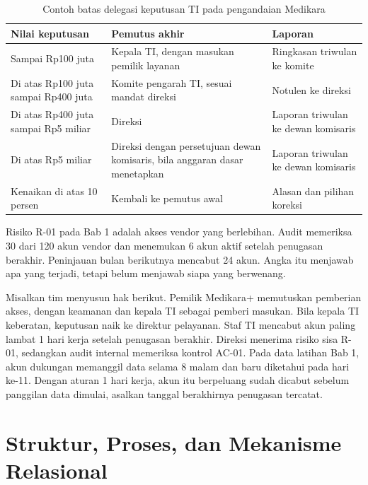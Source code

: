 \begin{table}[!htb]
  \centering\small
  \caption{Contoh batas delegasi keputusan TI pada pengandaian Medikara}
  \label{tab:ch02-delegasi}
  \begin{tabularx}{\textwidth}{|>{\raggedright\arraybackslash}p{}|>{\raggedright\arraybackslash}X|>{\raggedright\arraybackslash}p{}|}
    \hline
    \textbf{Nilai keputusan} & \textbf{Pemutus akhir} & \textbf{Laporan} \\ \hline
    Sampai Rp100 juta & Kepala TI, dengan masukan pemilik layanan & Ringkasan triwulan ke komite \\
    \hline
    Di atas Rp100 juta sampai Rp400 juta & Komite pengarah TI, sesuai mandat direksi &
    Notulen ke direksi \\ \hline
    Di atas Rp400 juta sampai Rp5 miliar & Direksi & Laporan triwulan ke dewan komisaris \\
    \hline
    Di atas Rp5 miliar & Direksi dengan persetujuan dewan komisaris, bila anggaran dasar
    menetapkan & Laporan triwulan ke dewan komisaris \\ \hline
    Kenaikan di atas 10 persen & Kembali ke pemutus awal & Alasan dan pilihan koreksi \\
    \hline
  \end{tabularx}
\end{table}

\begin{kasus}[title={Kasus Medikara Health: Siapa Mencabut Akun Vendor?}]
Risiko R-01 pada Bab 1 adalah akses vendor yang berlebihan. Audit memeriksa 30 dari 120 akun
vendor dan menemukan 6 akun aktif setelah penugasan berakhir. Peninjauan bulan berikutnya
mencabut 24 akun. Angka itu menjawab apa yang terjadi, tetapi belum menjawab siapa yang
berwenang.

Misalkan tim menyusun hak berikut. Pemilik Medikara+ memutuskan pemberian akses, dengan
keamanan dan kepala TI sebagai pemberi masukan. Bila kepala TI keberatan, keputusan naik
ke direktur pelayanan. Staf TI mencabut akun paling lambat 1 hari
kerja setelah penugasan berakhir. Direksi menerima risiko sisa R-01, sedangkan audit internal
memeriksa kontrol AC-01. Pada data latihan Bab 1, akun dukungan memanggil data selama 8 malam
dan baru diketahui pada hari ke-11. Dengan aturan 1 hari kerja, akun itu berpeluang sudah
dicabut sebelum panggilan data dimulai, asalkan tanggal berakhirnya penugasan tercatat.
\end{kasus}

\section{Struktur, Proses, dan Mekanisme Relasional}

